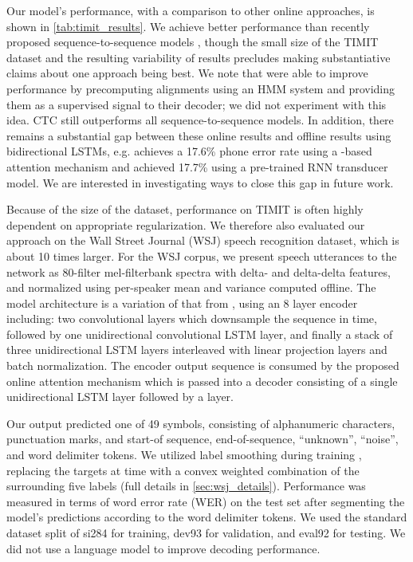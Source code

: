\documentclass{article}
\begin{document}
Our model's performance, with a comparison to other online approaches, is shown in \cref{tab:timit_results}.
We achieve better performance than recently proposed sequence-to-sequence models , though the small size of the TIMIT dataset and the resulting variability of results precludes making substantiative claims about one approach being best.
We note that  were able to improve performance by precomputing alignments using an HMM system and providing them as a supervised signal to their decoder; we did not experiment with this idea.
CTC  still outperforms all sequence-to-sequence models.
In addition, there remains a substantial gap between these online results and offline results using bidirectional LSTMs, e.g.  achieves a 17.6\% phone error rate using a -based attention mechanism and  achieved 17.7\% using a pre-trained RNN transducer model.
We are interested in investigating ways to close this gap in future work.

Because of the size of the dataset, performance on TIMIT is often highly dependent on appropriate regularization.
We therefore also evaluated our approach on the Wall Street Journal (WSJ) speech recognition dataset, which is about 10 times larger.
For the WSJ corpus, we present speech utterances to the network as 80-filter mel-filterbank spectra with delta- and delta-delta features, and normalized using per-speaker mean and variance computed offline.
The model architecture is a variation of that from , using an 8 layer encoder including: two convolutional layers which downsample the sequence in time, followed by one unidirectional convolutional LSTM layer, and finally a stack of three unidirectional LSTM layers interleaved with linear projection layers and batch normalization.
The encoder output sequence is consumed by the proposed online attention mechanism which is passed into a decoder consisting of a single unidirectional LSTM layer followed by a  layer.

Our output  predicted one of 49 symbols, consisting of alphanumeric characters, punctuation marks, and start-of sequence, end-of-sequence, ``unknown'', ``noise'', and word delimiter tokens.
We utilized label smoothing during training , replacing the targets at time  with a convex weighted combination of the surrounding five labels (full details in \cref{sec:wsj_details}).
Performance was measured in terms of word error rate (WER) on the test set after segmenting the model's predictions according to the word delimiter tokens.
We used the standard dataset split of si284 for training, dev93 for validation, and eval92 for testing.
We did not use a language model to improve decoding performance.
\end{document}
